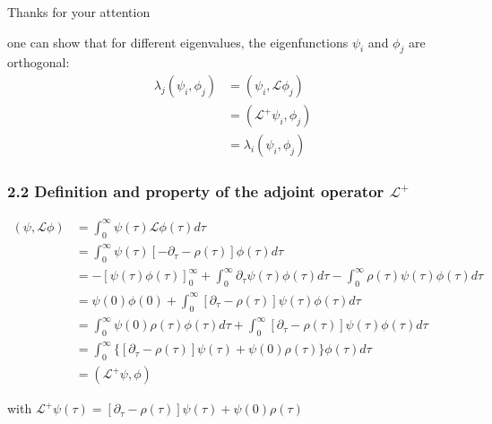 \documentclass{beamer}
\begin{document}
\begin{frame}

\hspace{2cm} \Large{Thanks for your attention}

\end{frame}






\begin{frame}
 one can show that for different eigenvalues, the eigenfunctions $\psi_i$ and $\phi_j$ are orthogonal:
\begin{align}
\lambda_j(\psi_i,\phi_j) 
&=(\psi_i,\mathcal{L}\phi_j) \nonumber \\
&=(\mathcal{L}^+\psi_i,\phi_j)  \nonumber \\
&=\lambda_i(\psi_i,\phi_j) \nonumber
\end{align}

\end{frame}


\begin{frame}
\frametitle{2.2 Definition and property of the adjoint operator $\mathcal{L}^+$}

\begin{align}
(\psi,\mathcal{L}\phi)&= \int_{0}^{\infty}\psi(\tau)\mathcal{L}\phi(\tau)d\tau  \nonumber \\
&= \int_{0}^{\infty}\psi(\tau)[-\partial_{\tau}-\rho(\tau)]\phi(\tau)d\tau  \nonumber \\
&=-[\psi(\tau)\phi(\tau)]^{\infty}_{0}+\int_{0}^{\infty}\partial_{\tau}\psi(\tau)\phi(\tau)d\tau -\int_{0}^{\infty}\rho(\tau)\psi(\tau)\phi(\tau)d\tau \nonumber \\
&= \psi(0)\phi(0)+ \int_{0}^{\infty}[\partial_{\tau}-\rho(\tau)]\psi(\tau)\phi(\tau)d\tau  \nonumber \\
&=\int_{0}^{\infty} \psi(0)\rho(\tau)\phi(\tau)d\tau+ \int_{0}^{\infty}[\partial_{\tau}-\rho(\tau)]\psi(\tau)\phi(\tau)d\tau  \nonumber \\
&= \int_{0}^{\infty}\{[\partial_{\tau}-\rho(\tau)]\psi(\tau)+ \psi(0)\rho(\tau)\}\phi(\tau)d\tau  \nonumber \\
& = (\mathcal{L}^+\psi,\phi) \nonumber
\end{align}

with 
$
\mathcal{L}^+\psi(\tau)=[\partial_{\tau}-\rho(\tau)]\psi(\tau)+\psi(0)\rho(\tau)
$
\end{frame}
\end{document}
